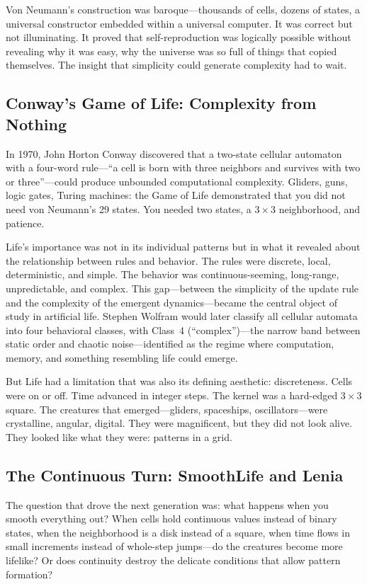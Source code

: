 \documentclass[11pt,a4paper]{article}
\begin{document}
Von Neumann's construction was baroque---thousands of cells, dozens of
states, a universal constructor embedded within a universal computer. It
was correct but not illuminating. It proved that self-reproduction was
logically possible without revealing why it was easy, why the universe was
so full of things that copied themselves. The insight that simplicity could
generate complexity had to wait.

\subsection{Conway's Game of Life: Complexity from Nothing}

In 1970, John Horton Conway discovered that a two-state cellular automaton
with a four-word rule---``a cell is born with three neighbors and survives
with two or three''---could produce unbounded computational complexity.
Gliders, guns, logic gates, Turing machines: the Game of Life demonstrated
that you did not need von Neumann's 29 states. You needed two states, a
$3\times3$ neighborhood, and patience.

Life's importance was not in its individual patterns but in what it revealed
about the relationship between rules and behavior. The rules were discrete,
local, deterministic, and simple. The behavior was continuous-seeming,
long-range, unpredictable, and complex. This gap---between the simplicity of
the update rule and the complexity of the emergent dynamics---became the
central object of study in artificial life. Stephen Wolfram would later
classify all cellular automata into four behavioral classes, with Class~4
(``complex'')---the narrow band between static order and chaotic noise---identified
as the regime where computation, memory, and something resembling life could
emerge.

But Life had a limitation that was also its defining aesthetic: discreteness.
Cells were on or off. Time advanced in integer steps. The kernel was a
hard-edged $3\times3$ square. The creatures that emerged---gliders,
spaceships, oscillators---were crystalline, angular, digital. They were
magnificent, but they did not look alive. They looked like what they were:
patterns in a grid.

\subsection{The Continuous Turn: SmoothLife and Lenia}

The question that drove the next generation was: what happens when you
smooth everything out? When cells hold continuous values instead of binary
states, when the neighborhood is a disk instead of a square, when time flows
in small increments instead of whole-step jumps---do the creatures become
more lifelike? Or does continuity destroy the delicate conditions that allow
pattern formation?
\end{document}

